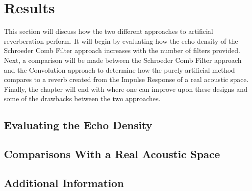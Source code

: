 \chapter{Results}
\hspace*{-0.187cm}This section will discuss how the two different approaches to artificial reverberation perform. It will begin by evaluating how the echo density of the Schroeder Comb Filter approach increases with the number of filters provided. Next, a comparison will be made between the Schroeder Comb Filter approach and the Convolution approach to determine how the purely artificial method compares to a reverb created from the Impulse Response of a real acoustic space. Finally, the chapter will end with where one can improve upon these designs and some of the drawbacks between the two approaches.

\section{Evaluating the Echo Density}


\section{Comparisons With a Real Acoustic Space}
\section{Additional Information}
